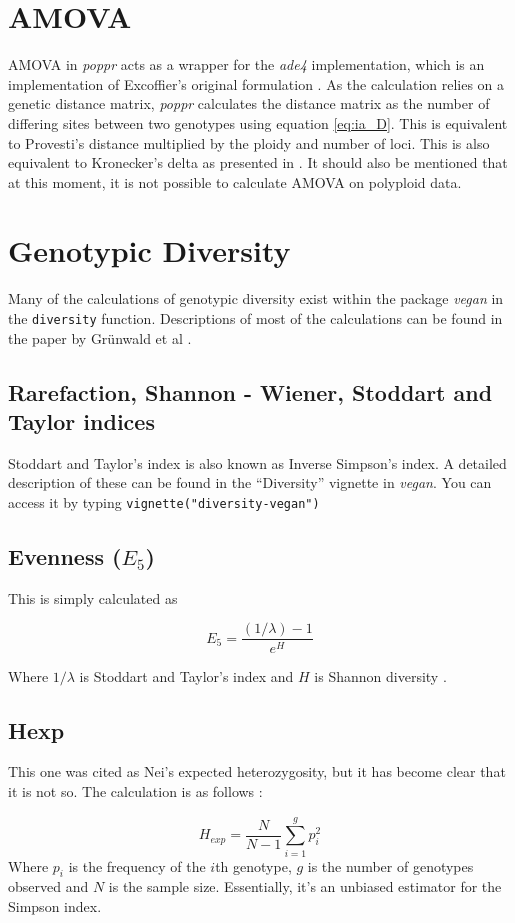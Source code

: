 \documentclass[letterpaper]{article}\usepackage[]{graphicx}\usepackage[]{color}
\newcommand{\poppr}{\textit{poppr}}
\begin{document}
\section{AMOVA}

AMOVA in \poppr{} acts as a wrapper for the \textit{ade4} implementation, which
is an implementation of Excoffier's original formulation
\cite{excoffier1992analysis}. As the calculation relies on a genetic distance
matrix, \poppr{} calculates the distance matrix as the number of differing sites
between two genotypes using equation \ref{eq:ia_D}. This is equivalent to
Provesti's distance multiplied by the ploidy and number of loci. This is also
equivalent to Kronecker's delta as presented in \cite{excoffier1992analysis}. It
should also be mentioned that at this moment, it is not possible to calculate
AMOVA on polyploid data.

\section{Genotypic Diversity}

Many of the calculations of genotypic diversity exist within the package \textit{vegan} in the \texttt{diversity}
function. Descriptions of most of the calculations can be found in the paper by Gr\"unwald et al \cite{Grunwald:2003}.

\subsection{Rarefaction, Shannon - Wiener, Stoddart and Taylor indices}

Stoddart and Taylor's index is also known as Inverse Simpson's index.
A detailed description of these can be found in the ``Diversity'' vignette in \textit{vegan}. You can access it by typing \texttt{vignette("diversity-vegan")}

\subsection{Evenness ($E_{5}$)}
This is simply calculated as 

\begin{equation}
E_{5} = \frac{(1/\lambda) - 1}{e^{H}}
\end{equation}

Where $1/\lambda$ is Stoddart and Taylor's index and $H$ is Shannon diversity \cite{Stoddart:1988,Shannon:1948}.

\subsection{Hexp}

This one was cited as Nei's expected heterozygosity, but it has become clear
that it is not so. The calculation is as follows \cite{Agapow:2001}:

\begin{equation}
H_{exp} = \frac{N}{N-1} \sum_{i=1}^{g}{p^{2}_{i}}
\end{equation}
\noindent
Where $p_i$ is the frequency of the $i$th genotype, $g$ is the number of
genotypes observed and $N$ is the sample size. Essentially, it's an unbiased
estimator for the Simpson index.



\end{document}
